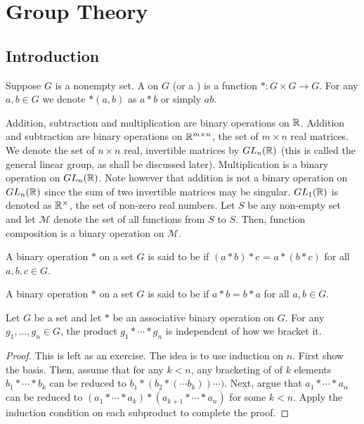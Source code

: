 \section{Group Theory}

\subsection{Introduction}

\begin{defn}
    Suppose $G$ is a nonempty set. A  on $G$ (or a ) is a function $\ast \colon G \times G \to G$. For any $a,b \in G$ we denote $\ast(a,b)$ as $a \ast b$ or simply $ab$.
\end{defn}

\begin{ex}
    Addition, subtraction and multiplication are binary operations on $\mathbb{R}$. Addition and subtraction are binary operations on $\mathbb{R}^{m \times n}$, the set of $m \times n$ real matrices. We denote the set of $n \times n$ real, invertible matrices by $GL_n(\mathbb{R})$ (this is called the general linear group, as shall be discussed later). Multiplication is a binary operation on $GL_n(\mathbb{R})$. Note however that addition is not a binary operation on $GL_n(\mathbb{R})$ since the sum of two invertible matrices may be singular. $GL_1(\mathbb{R})$ is denoted as $\mathbb{R}^{\times}$, the set of non-zero real numbers. Let $S$ be any non-empty set and let $\mathcal{M}$ denote the set of all functions from $S$ to $S$. Then, function composition is a binary operation on $\mathcal{M}$.
\end{ex}

\begin{defn}
    A binary operation $\ast$ on a set $G$ is said to be  if $(a \ast b) \ast c$ = $a \ast (b \ast c)$ for all $a,b,c \in G$.
\end{defn}

\begin{defn}
    A binary operation $\ast$ on a set $G$ is said to be  if $a\ast b = b\ast a$ for all $a,b \in G$.
\end{defn}

\begin{prop} \label{prop:gen-ass-law}
    Let $G$ be a set and let $\ast$ be an associative binary operation on $G$. For any $g_1, \ldots, g_n \in G$, the product $g_1 \ast \cdots \ast g_n$ is independent of how we bracket it. 
\end{prop}
\begin{proof}
    This is left as an exercise. The idea is to use induction on $n$. First show the basis. Then, assume that for any $k<n$, any bracketing of of $k$ elements $b_1 \ast \cdots \ast b_k$ can be reduced to $b_1 \ast (b_2 \ast ( \cdots b_k)) \cdots)$. Next, argue that $a_1 \ast \cdots \ast a_n$ can be reduced to $(a_1 \ast \cdots \ast a_k) \ast (a_{k+1} \ast \cdots \ast a_n)$ for some $k < n$. Apply the induction condition on each subproduct to complete the proof.
\end{proof}

